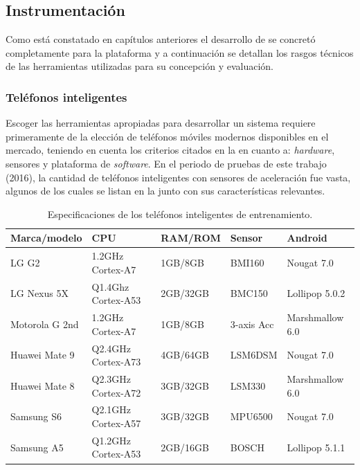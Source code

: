 \subsection{Instrumentación}

Como está constatado en capítulos anteriores el desarrollo de \emph{
}se concretó completamente para la plataforma \emph{
}y a continuación se detallan los rasgos técnicos de las herramientas
utilizadas para su concepción y evaluación.

\subsubsection{Teléfonos inteligentes}

Escoger las herramientas apropiadas para desarrollar un sistema 
requiere primeramente de la elección de teléfonos móviles modernos
disponibles en el mercado, teniendo en cuenta los criterios citados
en la  en cuanto a: \emph{hardware},
sensores y plataforma de \emph{software}. En el periodo de pruebas
de este trabajo (2016), la cantidad de teléfonos inteligentes con
sensores de aceleración fue vasta, algunos de los cuales se listan
en la  junto con sus características relevantes.

\begin{table}[h]
\begin{centering}
\begin{tabular}{|l|>{\raggedright}p{2.5cm}|l|>{\raggedright}p{2cm}|l|}
\hline 
Marca/modelo & CPU & RAM/ROM & Sensor & Android\tabularnewline
\hline 
\hline 
LG G2 & 1.2GHz Cortex-A7 & 1GB/8GB & BMI160 & Nougat 7.0\tabularnewline
\hline 
LG Nexus 5X & Q1.4Ghz Cortex-A53 & 2GB/32GB & BMC150 & Lollipop 5.0.2\tabularnewline
\hline 
Motorola G 2nd & 1.2GHz Cortex-A7 & 1GB/8GB & 3-axis Acc & Marshmallow 6.0\tabularnewline
\hline 
Huawei Mate 9 & Q2.4GHz Cortex-A73 & 4GB/64GB & LSM6DSM & Nougat 7.0\tabularnewline
\hline 
Huawei Mate 8 & Q2.3GHz Cortex-A72 & 3GB/32GB & LSM330  & Marshmallow 6.0\tabularnewline
\hline 
Samsung S6 & Q2.1GHz Cortex-A57 & 3GB/32GB & MPU6500 & Nougat 7.0\tabularnewline
\hline 
Samsung A5 & Q1.2GHz Cortex-A53  & 2GB/16GB & BOSCH & Lollipop 5.1.1\tabularnewline
\hline 
\end{tabular}
\par\end{centering}
\caption[Especificaciones de teléfonos inteligentes]{\label{tab6:dispositivos}Especificaciones de los teléfonos inteligentes
de entrenamiento.}
\end{table}

